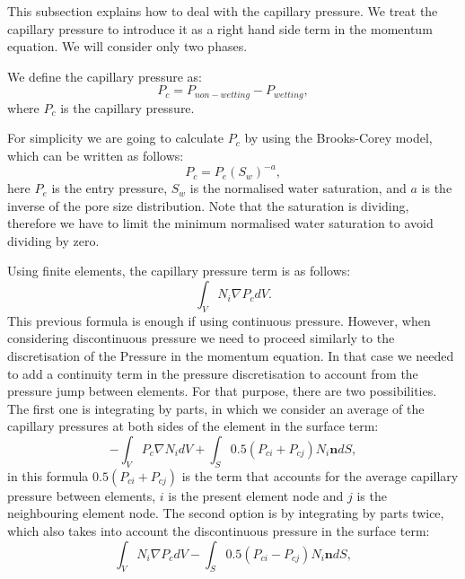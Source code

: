 This subsection explains how to deal with the capillary pressure. We treat the capillary pressure to introduce it as a right hand side term in the momentum equation. We will consider only two phases.

We define the capillary pressure as:
\begin{equation}
P_c = P_{non-wetting} - P_{wetting},
\end{equation}
where $P_c $ is the capillary pressure.
 
For simplicity we are going to calculate $P_c $ by using the Brooks-Corey model, which can be written as follows:
\begin{equation}
P_c = P_e (S_w)^{-a},
\end{equation}
here $P_e$ is the entry pressure, $S_w $ is the normalised water saturation, and $a $ is the inverse of the pore size distribution. Note that the saturation is dividing, therefore we have to limit the minimum normalised water saturation to avoid dividing by zero.

Using finite elements, the capillary pressure term is as follows:
\begin{equation}
\int_V N_i \nabla P_c dV.
\label{Cap_pressure_initial}
\end{equation}
This previous formula is enough if using continuous pressure. However, when considering discontinuous pressure we need to proceed similarly to the discretisation of the Pressure in the momentum equation. In that case we needed to add a continuity term in the pressure discretisation to account from the pressure jump between elements. For that purpose, there are two possibilities. The first one is integrating by parts, in which we consider an average of the capillary pressures at both sides of the element in the surface term:
\begin{equation}
-\int_V P_c \nabla N_i dV + \int_S 0.5 (P_{ci} + P_{cj})  N_i \mathbf{n} dS,
\label{cappressure_intbyparts1}
\end{equation}
in this formula $ 0.5 (P_{ci} + P_{cj})$ is the term that accounts for the average capillary pressure between elements, $i$ is the present element node and $j$ is the neighbouring element node. The second option is by integrating by parts twice, which also takes into account the discontinuous pressure in the surface term:
\begin{equation}
\int_V N_i \nabla P_c dV - \int_S 0.5 (P_{ci} - P_{cj})  N_i \mathbf{n} dS,
\label{cappressure_intbyparts2}
\end{equation}

